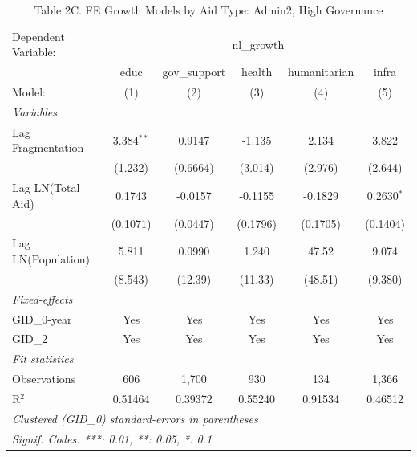 \begin{table}[H]
   \caption{Table 2C. FE Growth Models by Aid Type: Admin2, High Governance}
   \centering
   \begin{tabular}{lccccc}
      \tabularnewline \midrule \midrule
      Dependent Variable: & \multicolumn{5}{c}{nl\_growth}\\
                         & educ         & gov\_support  & health   & humanitarian & infra \\   
      Model:             & (1)          & (2)           & (3)      & (4)          & (5)\\  
      \midrule
      \emph{Variables}\\
      Lag Fragmentation  & 3.384$^{**}$ & 0.9147        & -1.135   & 2.134        & 3.822\\   
                         & (1.232)      & (0.6664)      & (3.014)  & (2.976)      & (2.644)\\   
      Lag LN(Total Aid)  & 0.1743       & -0.0157       & -0.1155  & -0.1829      & 0.2630$^{*}$\\   
                         & (0.1071)     & (0.0447)      & (0.1796) & (0.1705)     & (0.1404)\\   
      Lag LN(Population) & 5.811        & 0.0990        & 1.240    & 47.52        & 9.074\\   
                         & (8.543)      & (12.39)       & (11.33)  & (48.51)      & (9.380)\\   
      \midrule
      \emph{Fixed-effects}\\
      GID\_0-year        & Yes          & Yes           & Yes      & Yes          & Yes\\  
      GID\_2             & Yes          & Yes           & Yes      & Yes          & Yes\\  
      \midrule
      \emph{Fit statistics}\\
      Observations       & 606          & 1,700         & 930      & 134          & 1,366\\  
      R$^2$              & 0.51464      & 0.39372       & 0.55240  & 0.91534      & 0.46512\\  
      \midrule \midrule
      \multicolumn{6}{l}{\emph{Clustered (GID\_0) standard-errors in parentheses}}\\
      \multicolumn{6}{l}{\emph{Signif. Codes: ***: 0.01, **: 0.05, *: 0.1}}\\
   \end{tabular}
\end{table}



